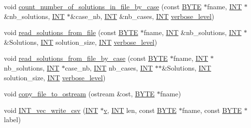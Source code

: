 \begin{DoxyCompactItemize}
\item 
void \mbox{\hyperlink{util_8_c_a551b74b17bbcfb45bfcf847820f87304}{count\+\_\+number\+\_\+of\+\_\+solutions\+\_\+in\+\_\+file\+\_\+by\+\_\+case}} (const \mbox{\hyperlink{galois_8h_ab6cc7b4aeb6ea31aba2b3fbfc83ff5e6}{B\+Y\+TE}} $\ast$fname, \mbox{\hyperlink{galois_8h_a09fddde158a3a20bd2dcadb609de11dc}{I\+NT}} $\ast$\&nb\+\_\+solutions, \mbox{\hyperlink{galois_8h_a09fddde158a3a20bd2dcadb609de11dc}{I\+NT}} $\ast$\&case\+\_\+nb, \mbox{\hyperlink{galois_8h_a09fddde158a3a20bd2dcadb609de11dc}{I\+NT}} \&nb\+\_\+cases, \mbox{\hyperlink{galois_8h_a09fddde158a3a20bd2dcadb609de11dc}{I\+NT}} \mbox{\hyperlink{simeon_8_c_a818073fbcc2f439e7c56952f67386122}{verbose\+\_\+level}})
\item 
void \mbox{\hyperlink{util_8_c_a726805e3f54c37940c365598b47c26d6}{read\+\_\+solutions\+\_\+from\+\_\+file}} (const \mbox{\hyperlink{galois_8h_ab6cc7b4aeb6ea31aba2b3fbfc83ff5e6}{B\+Y\+TE}} $\ast$fname, \mbox{\hyperlink{galois_8h_a09fddde158a3a20bd2dcadb609de11dc}{I\+NT}} \&nb\+\_\+solutions, \mbox{\hyperlink{galois_8h_a09fddde158a3a20bd2dcadb609de11dc}{I\+NT}} $\ast$\&Solutions, \mbox{\hyperlink{galois_8h_a09fddde158a3a20bd2dcadb609de11dc}{I\+NT}} solution\+\_\+size, \mbox{\hyperlink{galois_8h_a09fddde158a3a20bd2dcadb609de11dc}{I\+NT}} \mbox{\hyperlink{simeon_8_c_a818073fbcc2f439e7c56952f67386122}{verbose\+\_\+level}})
\item 
void \mbox{\hyperlink{util_8_c_a0e4fdb84a9ae414bce77585fc34ace1f}{read\+\_\+solutions\+\_\+from\+\_\+file\+\_\+by\+\_\+case}} (const \mbox{\hyperlink{galois_8h_ab6cc7b4aeb6ea31aba2b3fbfc83ff5e6}{B\+Y\+TE}} $\ast$fname, \mbox{\hyperlink{galois_8h_a09fddde158a3a20bd2dcadb609de11dc}{I\+NT}} $\ast$nb\+\_\+solutions, \mbox{\hyperlink{galois_8h_a09fddde158a3a20bd2dcadb609de11dc}{I\+NT}} $\ast$case\+\_\+nb, \mbox{\hyperlink{galois_8h_a09fddde158a3a20bd2dcadb609de11dc}{I\+NT}} nb\+\_\+cases, \mbox{\hyperlink{galois_8h_a09fddde158a3a20bd2dcadb609de11dc}{I\+NT}} $\ast$$\ast$\&Solutions, \mbox{\hyperlink{galois_8h_a09fddde158a3a20bd2dcadb609de11dc}{I\+NT}} solution\+\_\+size, \mbox{\hyperlink{galois_8h_a09fddde158a3a20bd2dcadb609de11dc}{I\+NT}} \mbox{\hyperlink{simeon_8_c_a818073fbcc2f439e7c56952f67386122}{verbose\+\_\+level}})
\item 
void \mbox{\hyperlink{util_8_c_a468782dfbc72bc98cfbc6b00ff8a6ba6}{copy\+\_\+file\+\_\+to\+\_\+ostream}} (ostream \&ost, \mbox{\hyperlink{galois_8h_ab6cc7b4aeb6ea31aba2b3fbfc83ff5e6}{B\+Y\+TE}} $\ast$fname)
\item 
void \mbox{\hyperlink{util_8_c_af2e3e8931ad88b6499ced61caac79240}{I\+N\+T\+\_\+vec\+\_\+write\+\_\+csv}} (\mbox{\hyperlink{galois_8h_a09fddde158a3a20bd2dcadb609de11dc}{I\+NT}} $\ast$\mbox{\hyperlink{simeon_8_c_aeb3f3030944801b163bc3b829a7f6710}{v}}, \mbox{\hyperlink{galois_8h_a09fddde158a3a20bd2dcadb609de11dc}{I\+NT}} len, const \mbox{\hyperlink{galois_8h_ab6cc7b4aeb6ea31aba2b3fbfc83ff5e6}{B\+Y\+TE}} $\ast$fname, const \mbox{\hyperlink{galois_8h_ab6cc7b4aeb6ea31aba2b3fbfc83ff5e6}{B\+Y\+TE}} $\ast$label)
$$
\end{DoxyCompactItemize}
